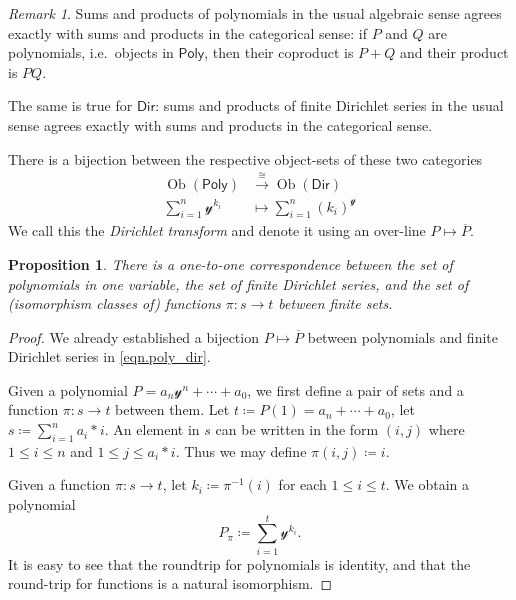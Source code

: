 \documentclass[11pt, article, one side]{memoir}
\theoremstyle{theorem}
\newtheorem{proposition}[equation]{Proposition}
\theoremstyle{definition}
\theoremstyle{remark}
\newtheorem{remark}[equation]{Remark}
\DeclareMathOperator{\ob}{Ob}
\newcommand{\Cat}[1]{\mathsf{#1}}%
\newcommand{\To}[1]{\xrightarrow{#1}}
\newcommand{\inv}{^{-1}}
\newcommand{\yon}{\mathcal{y}}
\newcommand{\poly}{\Cat{Poly}}
\newcommand{\dir}{\Cat{Dir}}
\begin{document}
\begin{remark}\label{rem.products_coproducts}
Sums and products of polynomials in the usual algebraic sense agrees exactly with sums and products in the categorical sense: if $P$ and $Q$ are polynomials, i.e.\ objects in $\poly$, then their coproduct is $P+Q$ and their product is $PQ$.

The same is true for $\dir$: sums and products of finite Dirichlet series in the usual sense agrees exactly with sums and products in the categorical sense.
\end{remark}

There is a bijection between the respective object-sets of these two categories
\begin{align}
\nonumber
	\ob(\poly)&\To{\cong}\ob(\dir)\\\label{eqn.poly_dir}
	\sum_{i=1}^n\yon^{k_i}&\mapsto\sum_{i=1}^n (k_i)^\yon
\end{align}
We call this the \emph{Dirichlet transform} and denote it using an over-line $P\mapsto \overline{P}$.

\begin{proposition}\label{prop.poly_function}
There is a one-to-one correspondence between the set of polynomials in one variable, the set of finite Dirichlet series, and the set of (isomorphism classes of) functions $\pi\colon s\to t$ between finite sets.
\end{proposition}
\begin{proof}
We already established a bijection $P\mapsto\overline{P}$ between polynomials and finite Dirichlet series in \cref{eqn.poly_dir}.

Given a polynomial $P=a_n\yon^n+\cdots+a_0$, we first define a pair of sets and a function $\pi\colon s\to t$ between them. Let $t\coloneqq P(1)=a_n+\cdots+a_0$, let $s\coloneqq\sum_{i=1}^na_i*i$. An element in $s$ can be written in the form $(i,j)$ where $1\leq i\leq n$ and $1\leq j\leq a_i*i$. Thus we may define $\pi(i,j)\coloneqq i$.

Given a function $\pi\colon s\to t$, let $k_i\coloneqq\pi\inv(i)$ for each $1\leq i\leq t$. We obtain a polynomial
\begin{equation}\label{eqn.Ppi}
	P_\pi\coloneqq\sum_{i=1}^{t}\yon^{k_i}.
\end{equation}
It is easy to see that the roundtrip for polynomials is identity, and that the round-trip for functions is a natural isomorphism.
\end{proof}
\end{document}
